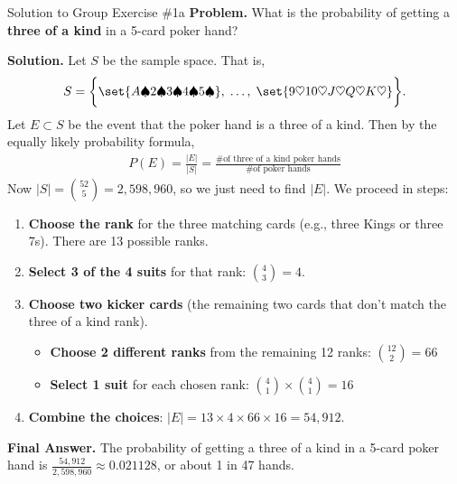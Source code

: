 \documentclass[10pt]{beamer}
\begin{document}
\begin{frame}{Solution to Group Exercise \#1a}
\footnotesize 
 \colorbox{blue!30}{\textbf{Problem.}} What is the probability of getting a \textbf{three of a kind} in a 5-card poker hand? 
 \vfill 

 \colorbox{green!30}{\textbf{Solution.}} Let $S$ be the sample space.  That is, 
\[S=\bigg\{ \set{A\spadesuit 2 \spadesuit 3 \spadesuit 4 \spadesuit 5 \spadesuit}, \;   \hdots, \; \set{9 \heartsuit 10 \heartsuit J \heartsuit Q \heartsuit K \heartsuit} \bigg\}. \]
Let $E \subset S$ be the event that the poker hand is a three of a kind. Then by the equally likely probability formula, 
\begin{align*}
P(E) = 	\frac{|E|}{|S|} = \frac{\text{\# of three of a kind poker hands}}{\text{\# of poker hands}}
\end{align*}
Now $|S|=\binom{52}{5} =  2,598,960$, so we just need to find $|E|$.  We proceed in steps:

\begin{enumerate} \footnotesize 
\item \textbf{Choose the rank} for the three matching cards 	(e.g., three Kings or three 7s).  There are 13 possible ranks.
\item \textbf{Select 3 of the 4 suits} for that rank:  $\binom{4}{3}=4$.
\item  \textbf{Choose two kicker cards} (the remaining two cards that don't match the three of a kind rank). 
	\begin{itemize} \footnotesize 
	\item[a.] 	\textbf{Choose 2 different ranks} from the remaining 12 ranks: $\binom{12}{2} = 66$ 
	\item[b.] \textbf{Select 1 suit} for each chosen rank: $\binom{4}{1} \times \binom{4}{1} = 16$
	\end{itemize}
\item \textbf{Combine the choices}:  $|E|=13 \times 4 \times 66 \times 16 = 54,912$.
\end{enumerate}
\vspace{-.1cm}
\alert{\textbf{Final Answer.}} The probability of getting a three of a kind in a 5-card poker hand is $\frac{54,912}{2,598,960} \approx 0.021128$, or about 1 in 47 hands.
\end{frame}
\end{document}
